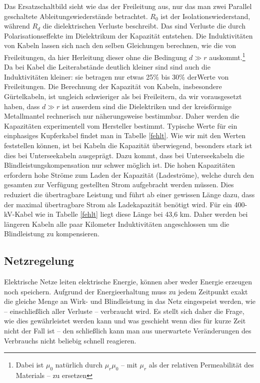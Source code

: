Das Ersatzschaltbild sieht wie das der Freileitung aus, nur das man zwei Parallel geschaltete Ableitungswiederstände betrachtet.
$R_0$ ist der Isolationswiederstand, während $R_d$ die dielektrischen Verluste beschreibt. Das sind Verluste die durch Polarisationseffekte im Dielektrikum der Kapazität entstehen.
Die Induktivitäten von Kabeln lassen sich nach den selben Gleichungen berechnen, wie die von Freileitungen, da hier Herleitung dieser ohne die Bedingung $d\gg r$ auskommt.\footnote{Dabei ist $\mu_0$ natürlich durch $\mu_r\mu_0$ – mit $\mu_r$ als der relativen Permeabilität des Materials – zu ersetzen} %
Da bei Kabel die Leiterabstände deutlich kleiner sind sind auch die Induktivitäten kleiner: sie betragen nur etwas 25\% bis 30\% derWerte von Freileitungen\cite{Flosdorff}.
Die Berechnung der Kapazität von Kabeln, insbesondere Gürtelkabeln, ist ungleich schwieriger als bei Freileitern, da wir vorausgesetzt haben, dass $d\gg r$ ist auserdem sind die Dielektriken und der kreisförmige Metallmantel rechnerisch nur näherungsweise bestimmbar. Daher werden die Kapazitäten experimentell vom Hersteller bestimmt.\cite{Flosdorff}
Typische Werte für ein einphasiges Kupferkabel findet man in Tabelle \ref{fehlt}.
Wie wir mit den Werten feststellen können, ist bei Kabeln die Kapazität überwiegend,
besonders stark ist dies bei Unterseekabeln ausgeprägt. %
Dazu kommt, dass bei Unterseekabeln die Blindleistungskompensation nur schwer möglich ist.
Die hohen Kapazitäten erfordern hohe Ströme zum Laden der Kapazität (Ladeströme), welche durch den gesamten zur Verfügung gestellten Strom aufgebracht werden müssen. Dies reduziert die übertragbare Leistung und führt ab einer gewissen Länge dazu, dass der maximal übertragbare Strom als Ladekapazität benötigt wird. %
Für ein 400-kV-Kabel wie in Tabelle \ref{fehlt} liegt diese Länge bei 43,6 km.
Daher werden bei längeren Kabeln alle paar Kilometer %
Induktivitäten angeschlossen um die Blindleistung zu kompensieren.

\subsection{Netzregelung}
Elektrische Netze leiten elektrische Energie, können aber weder Energie erzeugen noch speichern.
Aufgrund der Energieerhaltung muss zu jedem Zeitpunkt exakt die gleiche Menge an Wirk- und Blindleistung in das Netz eingespeist werden, wie – einschließlich aller Verluste – verbraucht wird.
Es stellt sich daher die Frage, wie dies gewährleistet werden kann und was geschieht wenn dies für kurze Zeit nicht der Fall ist – den schließlich kann man aus unerwartete Veränderungen des Verbrauchs nicht beliebig schnell reagieren.

